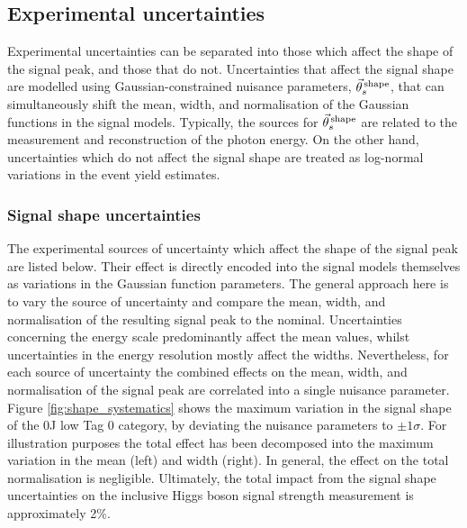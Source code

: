 \subsection{Experimental uncertainties}\label{sec:systematics_experimental}
Experimental uncertainties can be separated into those which affect the shape of the signal \mgg peak, and those that do not. Uncertainties that affect the signal shape are modelled using Gaussian-constrained nuisance parameters, $\vec{\theta}^{\,\rm{shape}}_{s}$, that can simultaneously shift the mean, width, and normalisation of the Gaussian functions in the signal models. Typically, the sources for $\vec{\theta}^{\,\rm{shape}}_{s}$ are related to the measurement and reconstruction of the photon energy. On the other hand, uncertainties which do not affect the signal shape are treated as log-normal variations in the event yield estimates. 

\subsubsection{Signal shape uncertainties}
The experimental sources of uncertainty which affect the shape of the signal \mgg peak are listed below. Their effect is directly encoded into the signal models themselves as variations in the Gaussian function parameters. The general approach here is to vary the source of uncertainty and compare the mean, width, and normalisation of the resulting signal \mgg peak to the nominal. Uncertainties concerning the energy scale predominantly affect the mean values, whilst uncertainties in the energy resolution mostly affect the widths. Nevertheless, for each source of uncertainty the combined effects on the mean, width, and normalisation of the signal peak are correlated into a single nuisance parameter. Figure \ref{fig:shape_systematics} shows the maximum variation in the signal shape of the 0J low \ptgg Tag 0 category, by deviating the nuisance parameters to $\pm 1\sigma$. For illustration purposes the total effect has been decomposed into the maximum variation in the mean (left) and width (right). In general, the effect on the total normalisation is negligible. Ultimately, the total impact from the signal shape uncertainties on the inclusive Higgs boson signal strength measurement is approximately 2\%.


